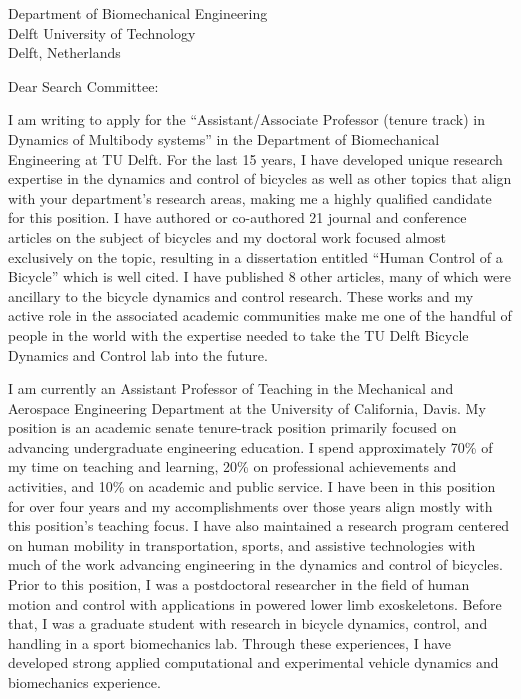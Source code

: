 \documentclass{letter}
\date{}
\begin{document}
\begin{letter}{
  Department of Biomechanical Engineering \\
  Delft University of Technology \\
  Delft, Netherlands
}

\opening{Dear Search Committee:}

I am writing to apply for the ``Assistant/Associate Professor (tenure track) in
Dynamics of Multibody systems'' in the Department of Biomechanical Engineering
at TU Delft. For the last 15 years, I have developed unique research expertise
in the dynamics and control of bicycles as well as other topics that align with
your department's research areas, making me a highly qualified candidate for
this position. I have authored or co-authored 21 journal and conference
articles on the subject of bicycles and my doctoral work focused almost
exclusively on the topic, resulting in a dissertation entitled ``Human Control
of a Bicycle'' which is well cited. I have published 8 other articles, many of
which were ancillary to the bicycle dynamics and control research. These works
and my active role in the associated academic communities make me one of the
handful of people in the world with the expertise needed to take the TU Delft
Bicycle Dynamics and Control lab into the future.

I am currently an Assistant Professor of Teaching in the Mechanical and
Aerospace Engineering Department at the University of California, Davis. My
position is an academic senate tenure-track position primarily focused on
advancing undergraduate engineering education. I spend approximately 70\% of my
time on teaching and learning, 20\% on professional achievements and
activities, and 10\% on academic and public service. I have been in this
position for over four years and my accomplishments over those years align
mostly with this position's teaching focus. I have also maintained a research
program centered on human mobility in transportation, sports, and assistive
technologies with much of the work advancing engineering in the dynamics and
control of bicycles. Prior to this position, I was a postdoctoral researcher in
the field of human motion and control with applications in powered lower limb
exoskeletons. Before that, I was a graduate student with research in bicycle
dynamics, control, and handling in a sport biomechanics lab. Through these
experiences, I have developed strong applied computational and experimental
vehicle dynamics and biomechanics experience.


\end{letter}
\end{document}
